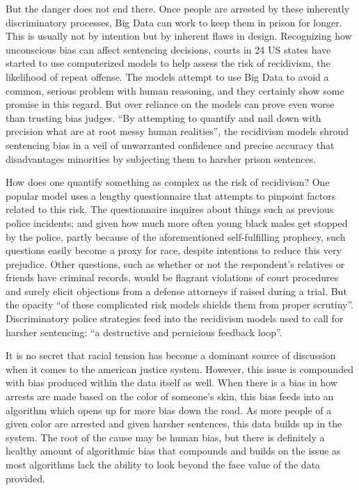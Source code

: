 \documentclass[sigconf]{acmart}
\begin{document}
	But the danger does not end there. Once people are arrested by these inherently discriminatory processes, Big Data can work to keep them in prison for longer. This is usually not by intention but by inherent flaws in design. Recognizing how unconscious bias can affect sentencing decisions, courts in 24 US states have started to use computerized models to help assess the risk of recidivism, the likelihood of repeat offense. The models attempt to use Big Data to avoid a common, serious problem with human reasoning, and they certainly show some promise in this regard. But over reliance on the models can prove even worse than trusting bias judges. ``By attempting to quantify and nail down with precision what are at root messy human realities'', the recidivism models shroud sentencing bias in a veil of unwarranted confidence and precise accuracy that disadvantages minorities by subjecting them to harsher prison sentences\cite{Wharton2016}.

How does one quantify something as complex as the risk of recidivism? One popular model uses a lengthy questionnaire that attempts to pinpoint factors related to this risk. The questionnaire inquires about things such as previous police incidents; and given how much more often young black males get stopped by the police, partly because of the aforementioned self-fulfilling prophecy, such questions easily become a proxy for race, despite intentions to reduce this very prejudice. Other questions, such as whether or not the respondent's relatives or friends have criminal records, would be flagrant violations of court procedures and surely elicit objections from a defense attorneys if raised during a trial. But the opacity ``of these complicated risk models shields them from proper scrutiny''\cite{Wharton2016}. Discriminatory police strategies feed into the recidivism models used to call for harsher sentencing: ``a destructive and pernicious feedback loop''\cite{Wharton2016}.

It is no secret that racial tension has become a dominant source of discussion when it comes to the american justice system. However, this issue is compounded with bias produced within the data itself as well. When there is a bias in how arrests are made based on the color of someone's skin, this bias feeds into an algorithm which opens up for more bias down the road. As more people of a given color are arrested and given harsher sentences, this data builds up in the system. The root of the cause may be human bias, but there is definitely a healthy amount of algorithmic bias that compounds and builds on the issue as most algorithms lack the ability to look beyond the face value of the data provided\cite{Eckhouse2017}.
\end{document}
